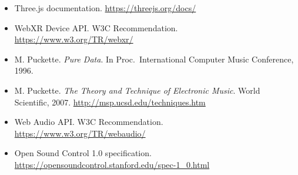 \documentclass[11pt,a4paper]{article}
\begin{document}
\begin{itemize}[leftmargin=2em]
    \item Three.js documentation. \url{https://threejs.org/docs/}
    \item WebXR Device API. W3C Recommendation.
          \url{https://www.w3.org/TR/webxr/}
    \item M. Puckette. \emph{Pure Data}. In Proc.\ International
          Computer Music Conference, 1996.
    \item M. Puckette. \emph{The Theory and Technique of Electronic
          Music}. World Scientific, 2007.
          \url{http://msp.ucsd.edu/techniques.htm}
    \item Web Audio API. W3C Recommendation.
          \url{https://www.w3.org/TR/webaudio/}
    \item Open Sound Control 1.0 specification.
          \url{https://opensoundcontrol.stanford.edu/spec-1_0.html}
\end{itemize}
\end{document}
